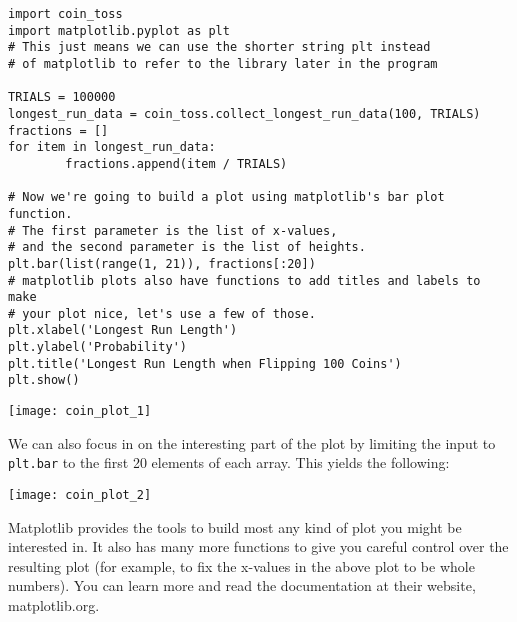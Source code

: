 \begin{lstlisting}
import coin_toss
import matplotlib.pyplot as plt 
# This just means we can use the shorter string plt instead 
# of matplotlib to refer to the library later in the program

TRIALS = 100000
longest_run_data = coin_toss.collect_longest_run_data(100, TRIALS)
fractions = []
for item in longest_run_data:
        fractions.append(item / TRIALS)
        
# Now we're going to build a plot using matplotlib's bar plot function. 
# The first parameter is the list of x-values, 
# and the second parameter is the list of heights.
plt.bar(list(range(1, 21)), fractions[:20])
# matplotlib plots also have functions to add titles and labels to make 
# your plot nice, let's use a few of those.
plt.xlabel('Longest Run Length')
plt.ylabel('Probability')
plt.title('Longest Run Length when Flipping 100 Coins')
plt.show()
\end{lstlisting}

\begin{center}
\texttt{[image: coin\_plot\_1]}
\end{center}

We can also focus in on the interesting part of the plot by limiting the input to \texttt{plt.bar} to the first 20 elements of each array. This yields the following:

\begin{center}
\texttt{[image: coin\_plot\_2]}
\end{center}

Matplotlib provides the tools to build most any kind of plot you might be interested in. It also has many more functions to give you careful control over the resulting plot (for example, to fix the x-values in the above plot to be whole numbers). You can learn more and read the documentation at their website, matplotlib.org.
